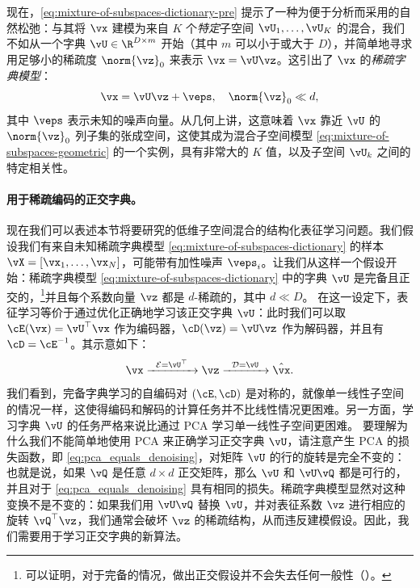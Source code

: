 \documentclass[../../book-main_zh.tex]{subfiles}
\begin{document}
现在，\eqref{eq:mixture-of-subspaces-dictionary-pre} 提示了一种为便于分析而采用的自然松弛：与其将 $\vx$ 建模为来自 $K$ 个\textit{特定}子空间 $\vU_1,
\dots, \vU_K$ 的混合，我们不如从一个字典 $\vU \in \R^{D \times m}$ 开始（其中 $m$
可以小于或大于 $D$），并简单地寻求用足够小的稀疏度 $\norm{\vz}_0$ 来表示 $\vx = \vU \vz$。这引出了
$\vx$ 的\textit{稀疏字典模型}：
\begin{equation}\label{eq:mixture-of-subspaces-dictionary}
    \vx =  \vU \vz + \veps,
    \quad
    \norm{\vz}_0 \ll d,
\end{equation}
其中 $\veps$ 表示未知的噪声向量。从几何上讲，这意味着 $\vx$ 靠近 $\vU$ 的 $\norm{\vz}_0$
列子集的张成空间，这使其成为混合子空间模型 \eqref{eq:mixture-of-subspaces-geometric}
的一个实例，具有非常大的 $K$ 值，以及子空间 $\vU_k$ 之间的特定相关性。

\paragraph{用于稀疏编码的正交字典。}
现在我们可以表述本节将要研究的低维子空间混合的结构化表征学习问题。我们假设我们有来自未知稀疏字典模型
\eqref{eq:mixture-of-subspaces-dictionary} 的样本 $\vX = [\vx_1, \dots,
\vx_N]$，可能带有加性噪声 $\veps_i$。让我们从这样一个假设开始：稀疏字典模型
\eqref{eq:mixture-of-subspaces-dictionary} 中的字典 $\vU$
是完备且正交的，\footnote{可以证明，对于完备的情况，做出正交假设并不会失去任何一般性（）。}并且每个系数向量
$\vz$ 都是 $d$-稀疏的，其中 $d \ll D$。
在这一设定下，表征学习等价于通过优化正确地学习该正交字典 $\vU$：此时我们可以取 $\cE(\vx) = \vU^\top \vx$ 作为编码器，$\cD(\vz) = \vU \vz$ 作为解码器，并且有 $\cD = \cE^{-1}$。其示意如下：
\begin{equation}
    \vx \xrightarrow{\hspace{2mm} \mathcal{E} = \vU^\top
    \hspace{2mm}}  \vz \xrightarrow{\hspace{2mm} \mathcal{D} = \vU
    \hspace{2mm}}   \hat{\vx}.
    \label{eqn:autoencoding-DL}
\end{equation}
我们看到，完备字典学习的自编码对 $(\cE, \cD)$
是对称的，就像单一线性子空间的情况一样，这使得编码和解码的计算任务并不比线性情况更困难。另一方面，学习字典 $\vU$
的任务严格来说比通过 PCA 学习单一线性子空间更困难。
要理解为什么我们不能简单地使用 PCA 来正确学习正交字典 $\vU$，请注意产生 PCA 的损失函数，即
\eqref{eq:pca_equals_denoising}，对矩阵 $\vU$ 的行的旋转是完全不变的：也就是说，如果 $\vQ$
是任意 $d \times d$ 正交矩阵，那么 $\vU$ 和 $\vU \vQ$ 都是可行的，并且对于
\eqref{eq:pca_equals_denoising} 具有相同的损失。稀疏字典模型显然对这种变换不是不变的：如果我们用 $\vU
\vQ$ 替换 $\vU$，并对表征系数 $\vz$ 进行相应的旋转 $\vQ^\top \vz$，我们通常会破坏 $\vz$
的稀疏结构，从而违反建模假设。因此，我们需要用于学习正交字典的新算法。
\end{document}
